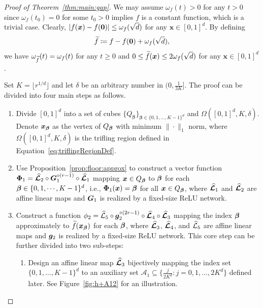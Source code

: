 \documentclass[nohyperref]{article}
\theoremstyle{plain}
\theoremstyle{definition}
\theoremstyle{remark}
\begin{document}
\begin{proof}[Proof of Theorem~\ref{thm:main:gap}]
We may assume $\omega_f(t)>0$ for any $t>0$ since $\omega_f(t_0)=0$ for some $t_0>0$ implies $f$ is a constant function, which is a trivial case.
Clearly, $|f(\bm{x})-f({\bm{0}})|\le \omega_f(\sqrt{d})$ for any ${\bm{x}}\in [0,1]^d$. By defining 
\begin{equation*}
	{\widetilde{f}}\coloneqq  f-f({\bm{0}})+\omega_f(\sqrt{d}),
\end{equation*} we have
$\omega_{\widetilde{f}}(t)=\omega_f(t)$ for any $t\ge 0$ and  $0\le {\widetilde{f}} (\bm{x}) \le 2\omega_f(\sqrt{d})$ for any ${\bm{x}}\in [0,1]^d$. 

Set $K=\lfloor r^{1/d}\rfloor$ and let $\delta$ be an arbitrary number in $(0,\tfrac{1}{3K}]$.
The proof can be divided into four main steps as follows.
\begin{enumerate}
	\item %
	Divide $[0,1]^d$ into a set of cubes $\{Q_{\bm{\beta}}\}_{\bm{\beta}\in \{0,1,\dotsc,K-1\}^d}$ and  $\Omega([0,1]^d,K,\delta)$. Denote ${\bm{x}}_{\bm{\beta}}$ as the vertex of $Q_{\bm{\beta}}$ with minimum $\|\cdot\|_1$ norm, where $\Omega([0,1]^d,K,\delta)$ is the trifling region defined in Equation~\eqref{eq:triflingRegionDef}.
	
	\item Use Proposition~\ref{prop:floor:approx} to construct a vector function ${\bm{\Phi}}_1={\bm{\mathcal{\widehat{L}}}}_2\circ {\bm{G}}_1^{\circ (r-1)}\circ {\bm{\mathcal{\widehat{L}}}}_1$ mapping ${\bm{x}}\in Q_{\bm{\beta}}$ to  ${\bm{\beta}}$ for each $\bmbeta\in \{0,1,\dotsc,K-1\}^d$, i.e., ${\bm{\Phi}}_1({\bm{x}})={\bm{\beta}}$ for all ${\bm{x}}\in Q_{\bm{\beta}}$, where ${\bm{\mathcal{\widehat{L}}}}_1$ and ${\bm{\mathcal{\widehat{L}}}}_2$ are affine linear maps and ${\bm{G}}_1$ is realized by a fixed-size ReLU network.
	
	\item Construct a  function $\phi_2={\mathcal{\widehat{L}}}_5\circ {\bm{g}}_2^{\circ (2r-1)}\circ {\bm{\mathcal{\widehat{L}}}}_4\circ {\bm{\mathcal{\widehat{L}}}}_3$  mapping the index ${\bm{\beta}}$ approximately to ${\widetilde{f}}({\bm{x}}_{\bm{\beta}})$ for each ${\bm{\beta}}$, where ${\bm{\mathcal{\widehat{L}}}}_3$, ${\bm{\mathcal{\widehat{L}}}}_4$, and ${\mathcal{\widehat{L}}}_5$ are affine linear maps and ${\bm{g}}_2$ is realized by a fixed-size ReLU network. This core step can be further divided into two sub-steps:	
	\begin{enumerate}
		\item[3.1.] Design an affine linear map ${\bm{\mathcal{\widehat{L}}}}_3$ bijectively mapping the index set $\{0,1,\dotsc,K-1\}^d$ to an auxiliary set $\mathcal{A}_1\subseteq \big\{\tfrac{j}{2K^d}:j=0,1,\dotsc,2K^d\big\}$ defined later. See Figure~\ref{fig:h+A12} for an illustration.
		

\end{enumerate}
\end{enumerate}
\end{proof}
\end{document}
